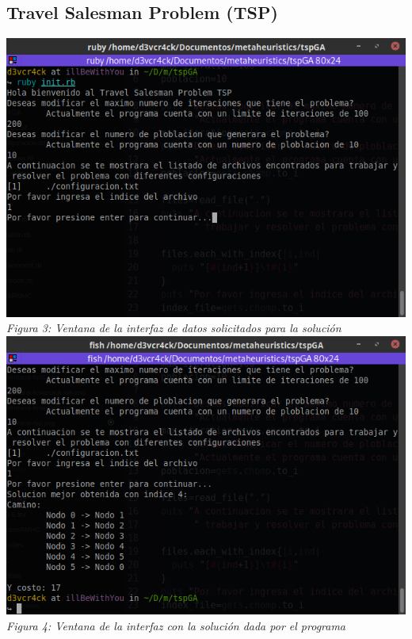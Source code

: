\documentclass[10pt]{article}
\begin{document}
\subsection{Travel Salesman Problem (TSP)}
\begin{center}
  \includegraphics[scale=0.5]{imgs/ventana-tsp.png}
  \\\textit{Figura 3: Ventana de la interfaz de datos solicitados para la solución}
  \\
  \includegraphics[scale=0.5]{imgs/ventana-tsp-sol.png}
  \\\textit{Figura 4: Ventana de la interfaz con la solución dada por el programa}
\end{center}
\end{document}
